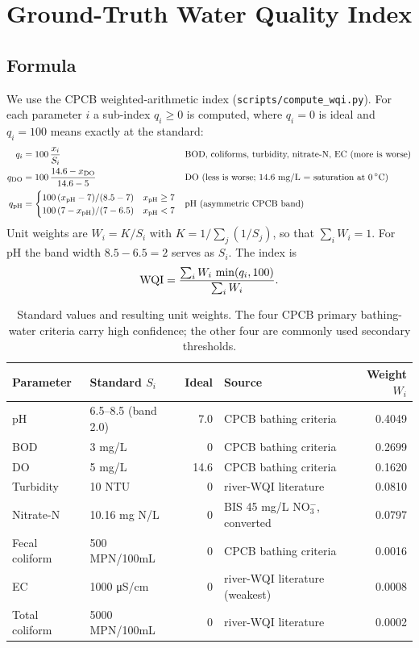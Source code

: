 \section{Ground-Truth Water Quality Index}
\label{sec:wqi}

\subsection{Formula}

We use the CPCB weighted-arithmetic index (\texttt{scripts/compute\_wqi.py}). For each parameter $i$ a sub-index $q_i\ge 0$ is computed, where $q_i=0$ is ideal and $q_i=100$ means exactly at the standard:
\begin{align}
  q_i &= 100\,\frac{x_i}{S_i} && \text{BOD, coliforms, turbidity, nitrate-N, EC (more is worse)} \\
  q_{\mathrm{DO}} &= 100\,\frac{14.6 - x_{\mathrm{DO}}}{14.6 - 5} && \text{DO (less is worse; 14.6 mg/L = saturation at 0\,\si{\celsius})} \\
  q_{\mathrm{pH}} &= \begin{cases} 100\,(x_{\mathrm{pH}}-7)/(8.5-7) & x_{\mathrm{pH}}\ge 7 \\ 100\,(7-x_{\mathrm{pH}})/(7-6.5) & x_{\mathrm{pH}}<7 \end{cases} && \text{pH (asymmetric CPCB band)}
\end{align}
Unit weights are $W_i = K/S_i$ with $K = 1/\sum_j (1/S_j)$, so that $\sum_i W_i = 1$. For pH the band width $8.5-6.5=2$ serves as $S_i$. The index is
\begin{equation}
  \mathrm{WQI} = \frac{\sum_i W_i\, \min(q_i, 100)}{\sum_i W_i}.
  \label{eq:wqi}
\end{equation}

\begin{table}[h]
\centering\small
\caption{Standard values and resulting unit weights. The four CPCB primary bathing-water criteria carry high confidence; the other four are commonly used secondary thresholds.}
\label{tab:standards}
\begin{tabular}{llrlr}
\toprule
Parameter & Standard $S_i$ & Ideal & Source & Weight $W_i$ \\
\midrule
pH & 6.5--8.5 (band 2.0) & 7.0 & CPCB bathing criteria & 0.4049 \\
BOD & 3 mg/L & 0 & CPCB bathing criteria & 0.2699 \\
DO & 5 mg/L & 14.6 & CPCB bathing criteria & 0.1620 \\
Turbidity & 10 NTU & 0 & river-WQI literature & 0.0810 \\
Nitrate-N & 10.16 mg N/L & 0 & BIS 45 mg/L NO$_3^-$, converted & 0.0797 \\
Fecal coliform & 500 MPN/100mL & 0 & CPCB bathing criteria & 0.0016 \\
EC & 1000 \si{\micro S/cm} & 0 & river-WQI literature (weakest) & 0.0008 \\
Total coliform & 5000 MPN/100mL & 0 & river-WQI literature & 0.0002 \\
\bottomrule
\end{tabular}
\end{table}

